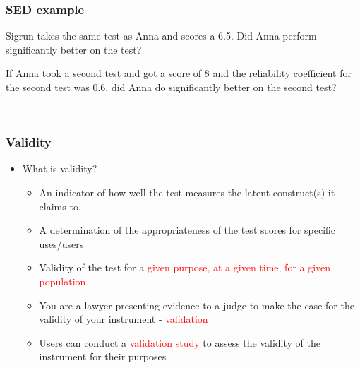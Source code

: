 \documentclass[dvipsnames]{beamer}\usepackage[]{graphicx}\usepackage[]{color}
\begin{document}
\begin{frame}
\frametitle{SED example}
Sigrun takes the same test as Anna and scores a 6.5. Did Anna perform significantly better on the test? 

\vspace{1cm}
If Anna took a second test and got a score of 8 and the reliability coefficient for the second test was 0.6, did Anna do significantly better on the second test?

\end{frame}

{
\begin{frame}
\centering\Huge \textcolor{white}{Validity}
\end{frame}
}

\frame
{
  \frametitle{Validity}

  \begin{itemize}
  	\item What is validity?
		\begin{itemize}
			\item An indicator of how well the test measures the latent construct(s) it claims to.
			\item A determination of the appropriateness of the test scores for specific uses/users 	
			\item Validity of the test for a \textcolor{red}{given purpose, at a given time, for a given population}
			\item You are a lawyer presenting evidence to a judge to make the case for the validity of your instrument - \textcolor{red}{validation}
			\item Users can conduct a \textcolor{red}{validation study} to assess the validity of the instrument for their purposes
		\end{itemize}  
  \end{itemize}
}



\end{document}
